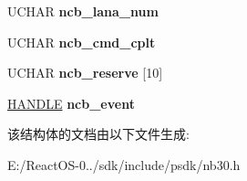 \begin{DoxyCompactItemize}
U\+C\+H\+AR {\bfseries ncb\+\_\+lana\+\_\+num}
\item 
\mbox{\label{struct___n_c_b_a7717991fa25fb44dad79451f2cc0c86a}} 
U\+C\+H\+AR {\bfseries ncb\+\_\+cmd\+\_\+cplt}
\item 
\mbox{\label{struct___n_c_b_ae399a9b36aa75c34530fc56aad13e70b}} 
U\+C\+H\+AR {\bfseries ncb\+\_\+reserve} \mbox{[}10\mbox{]}
\item 
\mbox{\label{struct___n_c_b_a0b1bcb192592ec4768bdec43b96cc5d6}} 
\hyperlink{interfacevoid}{H\+A\+N\+D\+LE} {\bfseries ncb\+\_\+event}
\end{DoxyCompactItemize}


该结构体的文档由以下文件生成\+:\begin{DoxyCompactItemize}
\item 
E\+:/\+React\+O\+S-\/0../sdk/include/psdk/nb30.\+h\end{DoxyCompactItemize}
